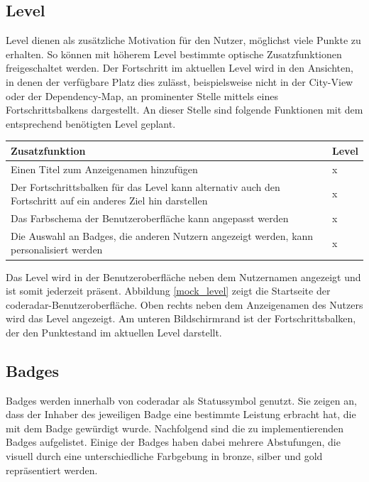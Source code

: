 \documentclass[
	oneside,  %
	ngerman, 
	final, 
	11pt, 
	a4paper, 
	1.1headlines, 
	headinclude=false, 
	footinclude=false, 
	mpinclude=false, 
	pagesize, 
	onecolumn, 
	titlepage, 
	parskip=half, 
	headsepline, 
	chapterprefix=false, 
	version=first, 
	listof=totoc, 
	bibliography=totoc, 
	toc=graduated, 
	fleqn
]{scrbook}
\begin{document}
\subsection{Level}
\label{coderadar_Level}
Level dienen als zusätzliche Motivation für den Nutzer, möglichst viele Punkte zu erhalten.
So können mit höherem Level bestimmte optische Zusatzfunktionen freigeschaltet werden.
Der Fortschritt im aktuellen Level wird in den Ansichten, in denen der verfügbare Platz dies zulässt, beispielsweise nicht in der City-View oder der Dependency-Map, an prominenter Stelle mittels eines Fortschrittsbalkens dargestellt.
An dieser Stelle sind folgende Funktionen mit dem entsprechend benötigten Level geplant.

\begin{center}
	\begin{tabular}{|p{12cm}|p{1cm}|}
		\hline
		Zusatzfunktion & Level \\ \hline
		Einen Titel zum Anzeigenamen hinzufügen & x \\ \hline
		Der Fortschrittsbalken für das Level kann alternativ auch den Fortschritt auf ein anderes Ziel hin darstellen & x \\ \hline
		Das Farbschema der Benutzeroberfläche kann angepasst werden & x \\ \hline
		Die Auswahl an Badges, die anderen Nutzern angezeigt werden, kann personalisiert werden & x \\ \hline
	\end{tabular}
\end{center}

Das Level wird in der Benutzeroberfläche neben dem Nutzernamen angezeigt und ist somit jederzeit präsent.
Abbildung \ref{mock_level} zeigt die Startseite der coderadar-Benutzeroberfläche.
Oben rechts neben dem Anzeigenamen des Nutzers wird das Level angezeigt.
Am unteren Bildschirmrand ist der Fortschrittsbalken, der den Punktestand im aktuellen Level darstellt.

\subsection{Badges}
\label{coderadar_Badges}
Badges werden innerhalb von coderadar als Statussymbol genutzt.
Sie zeigen an, dass der Inhaber des jeweiligen Badge eine bestimmte Leistung erbracht hat, die mit dem Badge gewürdigt wurde.
Nachfolgend sind die zu implementierenden Badges aufgelistet.
Einige der Badges haben dabei mehrere Abstufungen, die visuell durch eine unterschiedliche Farbgebung in bronze, silber und gold repräsentiert werden.
\end{document}
